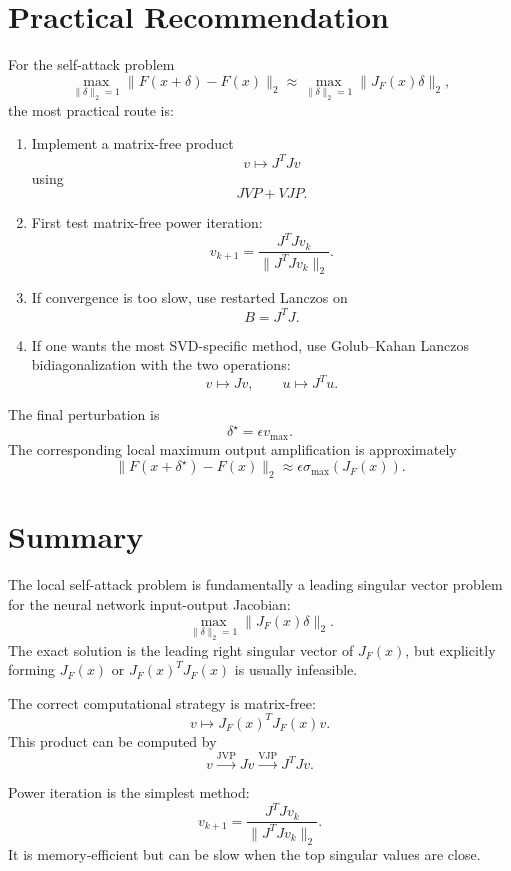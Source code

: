 \documentclass{article}
\begin{document}
\section{Practical Recommendation}

For the self-attack problem
\[
\max_{\|\delta\|_2=1}
\|F(x+\delta)-F(x)\|_2
\approx
\max_{\|\delta\|_2=1}
\|J_F(x)\delta\|_2,
\]
the most practical route is:

\begin{enumerate}
    \item Implement a matrix-free product
    \[
    v\mapsto J^TJv
    \]
    using
    \[
    JVP + VJP.
    \]

    \item First test matrix-free power iteration:
    \[
    v_{k+1}
    =
    \frac{J^TJv_k}{\|J^TJv_k\|_2}.
    \]

    \item If convergence is too slow, use restarted Lanczos on
    \[
    B=J^TJ.
    \]

    \item If one wants the most SVD-specific method, use Golub--Kahan Lanczos bidiagonalization with the two operations:
    \[
    v\mapsto Jv,
    \qquad
    u\mapsto J^Tu.
    \]
\end{enumerate}

The final perturbation is
\[
\delta^\star=\epsilon v_{\max}.
\]
The corresponding local maximum output amplification is approximately
\[
\|F(x+\delta^\star)-F(x)\|_2
\approx
\epsilon\sigma_{\max}(J_F(x)).
\]

\section{Summary}

The local self-attack problem is fundamentally a leading singular vector problem for the neural network input-output Jacobian:
\[
\max_{\|\delta\|_2=1}
\|J_F(x)\delta\|_2.
\]
The exact solution is the leading right singular vector of \(J_F(x)\), but explicitly forming \(J_F(x)\) or \(J_F(x)^TJ_F(x)\) is usually infeasible.

The correct computational strategy is matrix-free:
\[
v\mapsto J_F(x)^TJ_F(x)v.
\]
This product can be computed by
\[
v
\xrightarrow{\text{JVP}}
Jv
\xrightarrow{\text{VJP}}
J^TJv.
\]

Power iteration is the simplest method:
\[
v_{k+1}
=
\frac{J^TJv_k}{\|J^TJv_k\|_2}.
\]
It is memory-efficient but can be slow when the top singular values are close.
\end{document}
